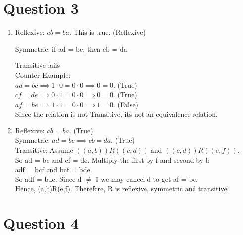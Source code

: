 \documentclass[twoside]{article}
\begin{document}
\section*{Question 3}

\begin{enumerate}
    \item[(i)] 
    Reflexive: $ab = ba$. This is true. (Reflexive)

    Symmetric: if ad = bc, then cb = da
    
    Transitive fails \\ 
    Counter-Example: \\
        $ad = bc \implies 1 \cdot 0 = 0 \cdot 0 \implies 0 = 0$. (True) \\
        $cf = de \implies 0 \cdot 1 = 0 \cdot 0 \implies 0 = 0$. (True) \\
        $af = be \implies 1 \cdot 1 = 0 \cdot 0 \implies 1 = 0$. (False) \\
        Since the relation is not Transitive, its not an equivalence relation.
    
    \item[(ii)]
    Reflexive: $ab = ba$. (True) \\
    Symmetric: $ad = bc \implies cb = da$. (True) \\
    Transitive: Assume $((a,b)) R ((c,d))$ and $((c,d)) R ((e,f))$. \\
    So ad = bc and cf = de. Multiply the first by f and second by b \\
    adf = bcf and bcf = bde. \\
    So adf = bde. Since d $\neq$ 0 we may cancel d to get af = be. \\
    Hence, (a,b)R(e,f). Therefore, R is reflexive, symmetric and transitive.
\end{enumerate}

\section*{Question 4}
\end{document}
